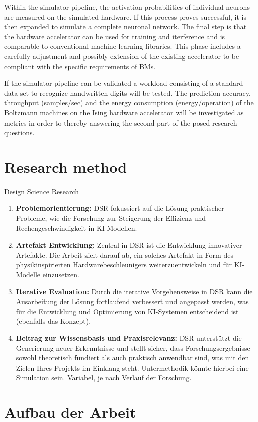 Within the simulator pipeline, the activation probabilities of individual neurons are measured on the simulated hardware.
If this process proves successful, it is then expanded to simulate a complete neuronal network.
The final step is that the hardware accelerator can be used for training and iterference
and is comparable to conventional machine learning libraries.
This phase includes a carefully adjustment and possibly extension of the existing accelerator to be compliant 
with the specific requirements of \ac{BM}s.

If the simulator pipeline can be validated a workload consisting of a standard data set
to recognize handwritten digits will be tested.
The prediction accuracy, throughput (samples/sec) and the energy consumption (energy/operation)
of the Boltzmann machines on the Ising hardware accelerator will be investigated as metrics in order to
thereby answering the second part of the posed research questions.


\section{Research method}

Design Science Research

\begin{enumerate}
    \item \textbf{Problemorientierung:} DSR fokussiert auf die Lösung praktischer Probleme, wie die Forschung zur Steigerung der Effizienz und Rechengeschwindigkeit in KI-Modellen.
    \item \textbf{Artefakt Entwicklung:} Zentral in DSR ist die Entwicklung innovativer Artefakte. Die Arbeit zielt darauf ab, ein solches Artefakt in Form des physikinspirierten Hardwarebeschleunigers weiterzuentwickeln und für KI-Modelle einzusetzen.
    \item \textbf{Iterative Evaluation:} Durch die iterative Vorgehensweise in DSR kann die Ausarbeitung der Lösung fortlaufend verbessert und angepasst werden, was für die Entwicklung und Optimierung von KI-Systemen entscheidend ist (ebenfalls das Konzept).
    \item \textbf{Beitrag zur Wissensbasis und Praxisrelevanz:} DSR unterstützt die Generierung neuer Erkenntnisse und stellt sicher, dass Forschungsergebnisse sowohl theoretisch fundiert als auch praktisch anwendbar sind, was mit den Zielen Ihres Projekts im Einklang steht. Untermethodik könnte hierbei eine Simulation sein. Variabel, je nach Verlauf der Forschung.
\end{enumerate}


\section{Aufbau der Arbeit}